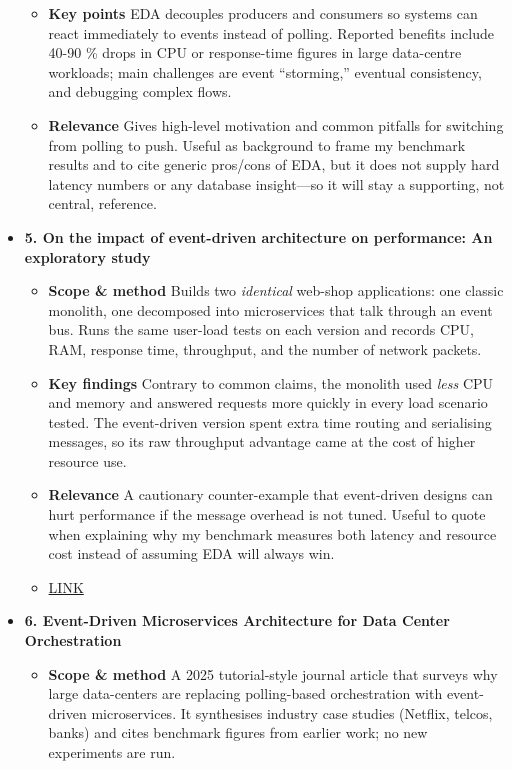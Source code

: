 \documentclass[11pt]{article}
\begin{document}
\begin{itemize}
\begin{itemize}
      \item[] \textbf{Key points} EDA decouples producers and consumers so systems can react immediately to events instead of polling.  Reported benefits include 40-90 \% drops in CPU or response-time figures in large data-centre workloads; main challenges are event “storming,” eventual consistency, and debugging complex flows.
      
      \item[] \textbf{Relevance} Gives high-level motivation and common pitfalls for switching from polling to push.  Useful as background to frame my benchmark results and to cite generic pros/cons of EDA, but it does not supply hard latency numbers or any database insight—so it will stay a supporting, not central, reference.
  \end{itemize}
  \item[] \textbf{5. On the impact of event-driven architecture on performance: An exploratory study}
  \begin{itemize}
      \item[] \textbf{Scope \& method}  Builds two \emph{identical} web-shop applications: one classic monolith, one decomposed into microservices that talk through an event bus.  
      Runs the same user-load tests on each version and records CPU, RAM, response time, throughput, and the number of network packets.
      
      \item[] \textbf{Key findings}  Contrary to common  claims, the monolith used \emph{less} CPU and memory and answered requests more quickly in every load scenario tested.  
      The event-driven version spent extra time routing and serialising messages, so its raw throughput advantage came at the cost of higher resource use.
      
      \item[] \textbf{Relevance}  A cautionary counter-example that event-driven designs can hurt performance if the message overhead is not tuned.  
      Useful to quote when explaining why my benchmark measures both latency and resource cost instead of assuming EDA will always win.
      \item[] \href{https://www.sciencedirect.com/science/article/pii/S0167739X23003977}{LINK}
  \end{itemize}
  \item[] \textbf{6. Event-Driven Microservices Architecture for Data Center Orchestration}
  \begin{itemize}
      \item[] \textbf{Scope \& method}  A 2025 tutorial-style journal article that surveys why large data-centers are replacing polling-based orchestration with event-driven microservices.  It synthesises industry case studies (Netflix, telcos, banks) and cites benchmark figures from earlier work; no new experiments are run.
      

\end{itemize}
\end{itemize}
\end{document}
